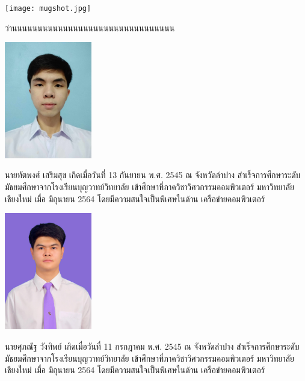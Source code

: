 \documentclass[semifinal]{cpecmu}
\author{นายชลนันต์ ทองไทย}{Chonlanan Thongthai}{640610625}
\author{นายทัตพงศ์ เสริมสุข}{Tadphong Sermsook}{640610636}
\author{นายศุภณัฐ วังทิพย์}{Suphanath Wangtip}{640612098}
\begin{document}


\pagestyle{empty}\cleardoublepage
\normalspacing \setcounter{page}{1}  \pagestyle{cpecmu}





\ifproject

\fi



\ifproject
\normalspacing
\appendix


\ifglossary\glossarypage\fi

\ifindex\indexpage\fi

\begin{biosketch}
  \begin{center}
    \texttt{[image: mugshot.jpg]}
  \end{center}
  \hspace{0.5in}ว่านนนนนนนนนนนนนนนนนนนนนนนนนนนนนนนน
\begin{center}
  \includegraphics[width=1.5in]{636.jpg}
\end{center}
\hspace{0.5in}นายทัตพงศ์ เสริมสุข เกิดเมื่อวันที่ 13 กันยายน พ.ศ. 2545 ณ จังหวัดลำปาง สำเร็จการศึกษาระดับมัธยมศึกษาจากโรงเรียนบุญวาทย์วิทยาลัย เข้าศึกษาที่ภาควิชาวิศวกรรมคอมพิวเตอร์ 
มหาวิทยาลัยเชียงใหม่ เมื่อ มิถุนายน 2564 โดยมีความสนใจเป็นพิเศษในด้าน เครือข่ายคอมพิวเตอร์
\begin{center}
  \includegraphics[width=1.5in]{098.jpg}
\end{center}
\hspace{0.5in}นายศุภณัฐ วังทิพย์ เกิดเมื่อวันที่ 11 กรกฎาคม พ.ศ. 2545 ณ จังหวัดลำปาง สำเร็จการศึกษาระดับมัธยมศึกษาจากโรงเรียนบุญวาทย์วิทยาลัย เข้าศึกษาที่ภาควิชาวิศวกรรมคอมพิวเตอร์ 
มหาวิทยาลัยเชียงใหม่ เมื่อ มิถุนายน 2564 โดยมีความสนใจเป็นพิเศษในด้าน เครือข่ายคอมพิวเตอร์
\end{biosketch}
\fi %
\end{document}
